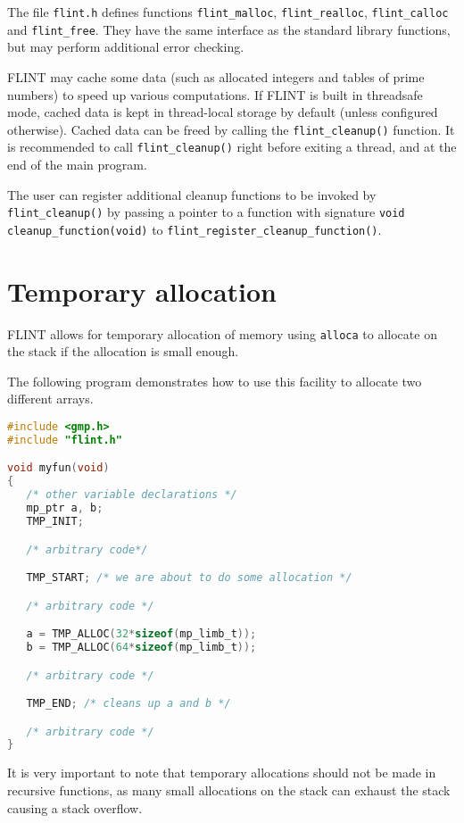 \documentclass[a4paper,10pt]{book}
\newcommand{\code}{\lstinline}
\begin{document}
The file \code{flint.h} defines functions \code{flint_malloc},
\code{flint_realloc}, \code{flint_calloc} and \code{flint_free}.
They have the same interface as the standard library functions, but
may perform additional error checking.

FLINT may cache some data (such as allocated integers
and tables of prime numbers) to speed up various computations.
If FLINT is built in threadsafe mode, cached data is kept in thread-local
storage by default (unless configured otherwise). Cached data can be freed
by calling the \code{flint_cleanup()} function. It is recommended to call
\code{flint_cleanup()} right before exiting a thread, and at the end of the
main program.

The user can register additional cleanup functions to be invoked
by \code{flint_cleanup()} by passing a pointer
to a function with signature \code{void cleanup_function(void)}
to \code{flint_register_cleanup_function()}.

\chapter{Temporary allocation}

FLINT allows for temporary allocation of memory using \code{alloca}
to allocate on the stack if the allocation is small enough.

The following program demonstrates how to use this facility to
allocate two different arrays.

\begin{lstlisting}[language=C]
#include <gmp.h>
#include "flint.h"

void myfun(void)
{
   /* other variable declarations */
   mp_ptr a, b;
   TMP_INIT;

   /* arbitrary code*/

   TMP_START; /* we are about to do some allocation */

   /* arbitrary code */

   a = TMP_ALLOC(32*sizeof(mp_limb_t));
   b = TMP_ALLOC(64*sizeof(mp_limb_t));

   /* arbitrary code */

   TMP_END; /* cleans up a and b */

   /* arbitrary code */
}
\end{lstlisting}

It is very important to note that temporary allocations should not be
made in recursive functions, as many small allocations on the stack
can exhaust the stack causing a stack overflow.
\end{document}
